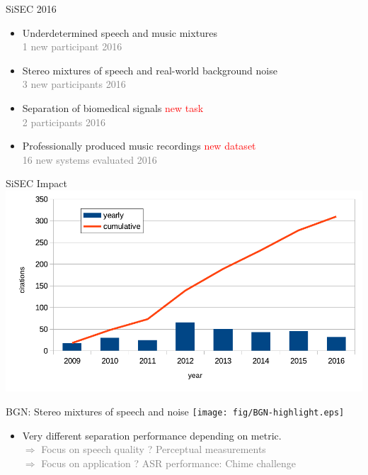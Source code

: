 \documentclass{beamer}
\begin{document}
\begin{frame}{SiSEC 2016}

\begin{itemize}

\item[UND]
  Underdetermined speech and music mixtures\\ \textcolor{gray}{1 new participant 2016} 
\item[BGN]
  Stereo mixtures of speech and real-world background noise\\ \textcolor{gray}{3 new participants 2016} 
\item[BIO]
  Separation of biomedical signals \textcolor{red}{new task}\\ \textcolor{gray}{2 participants 2016} 
\item[MUS]
  Professionally produced music recordings \textcolor{red}{new dataset}\\ \textcolor{gray}{16 new systems evaluated 2016} 
\end{itemize}

\end{frame}

\begin{frame}{SiSEC Impact}
\includegraphics[width=\textwidth]{fig/SiSEC_impact-eps-converted-to.pdf}
\end{frame}

\begin{frame}{BGN: Stereo mixtures of speech and noise}
\centering
\texttt{[image: fig/BGN-highlight.eps]}
\begin{itemize}
\item Very different separation performance depending on metric. \\ \textcolor{gray}{$\Rightarrow$ Focus on speech quality ? Perceptual measurements\\$\Rightarrow$ Focus on application ? ASR performance: Chime challenge}
\end{itemize}
\end{frame}
\end{document}
